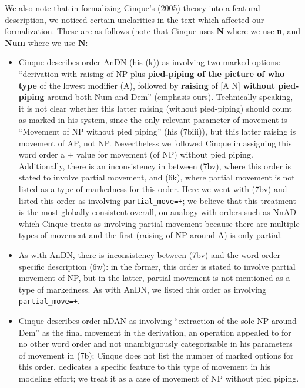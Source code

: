 \documentclass[11pt]{article}
\begin{document}
We also note that in formalizing Cinque's (2005) theory into a
featural description, we noticed certain unclarities in the text which
affected our formalization.  These are as follows (note that Cinque
uses \textbf{N} where we use \textbf{n}, and \textbf{Num} where we use
\textbf{N}:
%
\begin{itemize}
\item  Cinque describes order AnDN (his (k)) as involving two marked
  options: ``derivation with raising of NP plus \textbf{pied-piping of
    the picture of who type} of the lowest modifier (A), followed by
  \textbf{raising} of [A N] \textbf{without pied-piping} around both
  Num and Dem'' (emphasis ours).  Technically speaking, it is not
  clear whether this latter raising (without pied-piping) should count as marked
  in his system, since the only relevant parameter of movement 
   is ``Movement of NP without pied piping'' (his (7biii)), but this
   latter raising is movement of AP, not NP.  Nevertheless we followed
   Cinque in assigning this word order a $+$ value for movement
   (of NP) without pied piping.  Additionally, there is an
   inconsistency in \citet{cinque2005deriving} between (7bv), where
   this order is stated to involve partial movement, and (6k), where
   partial movement is not listed as a type of markedness for this
   order. Here we went with (7bv) and listed this order as involving
   \verb-partial_move=+-; we believe that this treatment is the most
   globally consistent overall, on analogy with orders such as NnAD
   which Cinque treats as involving partial movement because there are
   multiple types of movement and the first (raising of NP around A)
   is only partial.
 \item As with AnDN, there is inconsistency between (7bv) and the
   word-order-specific description (6w): in the  former, this order is
   stated to involve partial movement of NP, but in the latter,
   partial movement is not mentioned as a type of markedness.  As with AnDN,
   we listed this order as involving \verb-partial_move=+-.   %
 \item Cinque describes order nDAN as involving ``extraction of the
   sole NP around Dem'' as the final movement in the derivation, an
   operation appealed to for no other word order and not unambiguously
   categorizable in his parameters of movement in (7b); Cinque does
   not list the number of marked options for this order.
   \citet{cysouw2010dealing} dedicates a specific feature to this type
   of movement in his modeling effort; we treat it as a case of
   movement of NP without pied piping.
\end{itemize}
\end{document}
